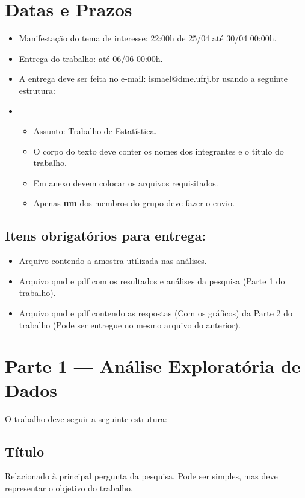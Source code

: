 \documentclass[12pt]{article}
\begin{document}
\section*{Datas e Prazos}
\begin{itemize}
    \item Manifestação do tema de interesse: 22:00h de 25/04 até 30/04 00:00h.
    \item Entrega do trabalho: até 06/06 00:00h.
    \item A entrega deve ser feita no e-mail: ismael@dme.ufrj.br usando a seguinte estrutura:
    \item \begin{itemize}
        \item Assunto: Trabalho de Estatística. 
        \item O corpo do texto deve conter os nomes dos integrantes e o título do trabalho. 
        \item Em anexo devem colocar os arquivos requisitados. 
        \item Apenas \textbf{um} dos membros do grupo deve fazer o envio.  
    \end{itemize}
\end{itemize}

\subsection*{Itens obrigatórios para entrega:}

\begin{itemize}
    \item Arquivo contendo a amostra utilizada nas análises. 
    \item Arquivo qmd e pdf com os resultados e análises da pesquisa (Parte 1 do trabalho).
    \item Arquivo qmd e pdf contendo as respostas (Com os gráficos) da Parte 2 do trabalho (Pode ser entregue no mesmo arquivo do anterior).  
\end{itemize}

\section*{Parte 1 — Análise Exploratória de Dados}
O trabalho deve seguir a seguinte estrutura:

\subsection*{Título}
Relacionado à principal pergunta da pesquisa. Pode ser simples, mas deve representar o objetivo do trabalho.
\end{document}

